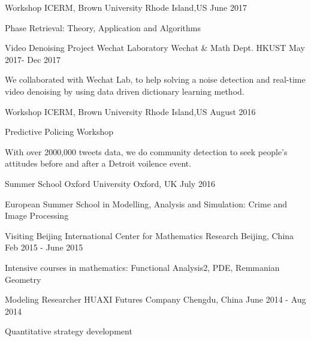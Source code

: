 \begin{cventries}
  \cventry
    {Workshop}
    {ICERM, Brown University}
    {Rhode Island,US}
    {June 2017}
    {
      \begin{cvitems}
        \item {Phase Retrieval: Theory, Application and Algorithms}
      \end{cvitems}
    }
  \cventry
    {Video Denoising Project}
    {Wechat Laboratory}
    {Wechat \& Math Dept. HKUST}
    {May 2017- Dec 2017}
    {
      \begin{cvitems}
        \item {We collaborated with Wechat Lab, to help solving a noise detection and real-time video denoising by using data driven dictionary learning method.}
      \end{cvitems}
    }
  \cventry
    {Workshop}
    {ICERM, Brown University}
    {Rhode Island,US}
    {August 2016}
    {
      \begin{cvitems}
        \item {Predictive Policing Workshop}
        \item {With over 2000,000 tweets data, we do community detection to seek people's attitudes before and after a Detroit voilence event.}
      \end{cvitems} 
    }
  \cventry
    {Summer School}
    {Oxford University}
    {Oxford, UK}
    {July 2016}
    {
      \begin{cvitems}
        \item {European Summer School in Modelling, Analysis and Simulation: Crime and Image Processing}
      \end{cvitems}
    }
  \cventry
    {Visiting}
    {Beijing International Center for Mathematics Research}
    {Beijing, China}
    {Feb 2015 - June 2015}
    {
      \begin{cvitems}
        \item {Intensive courses in mathematics: Functional Analysis2, PDE, Remmanian Geometry}
      \end{cvitems}
    }
  \cventry
    {Modeling Researcher}
    {HUAXI Futures Company}
    {Chengdu, China}
    {June 2014 - Aug 2014}
    {
      \begin{cvitems}
        \item {Quantitative strategy development}
      \end{cvitems}
    }
\end{cventries}
